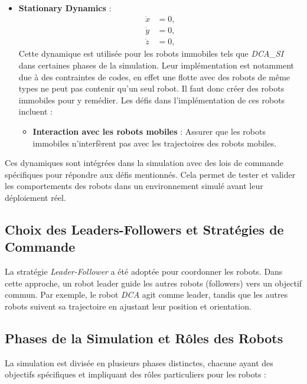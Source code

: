 \documentclass[a4paper,12pt]{article}
\begin{document}
\begin{itemize}
    \item \textbf{Stationary Dynamics} :
    \begin{equation*}
    \begin{aligned}
    \dot{x} &= 0, \\
    \dot{y} &= 0, \\
    \dot{z} &= 0,
    \end{aligned}
    \end{equation*}
    \noindent Cette dynamique est utilisée pour les robots immobiles tels que \textit{DCA\_SI} dans certaines phases de la simulation. Leur implémentation est notamment due à des contraintes de codes, en effet une flotte avec des robots de même types ne peut pas contenir qu'un seul robot. Il faut donc créer des robots immobiles pour y remédier. Les défis dans l'implémentation de ces robots incluent :
    \begin{itemize}
        \item \textbf{Interaction avec les robots mobiles} : Assurer que les robots immobiles n'interfèrent pas avec les trajectoires des robots mobiles.
    \end{itemize}
\end{itemize}

Ces dynamiques sont intégrées dans la simulation avec des lois de commande spécifiques pour répondre aux défis mentionnés. Cela permet de tester et valider les comportements des robots dans un environnement simulé avant leur déploiement réel.

\subsection*{Choix des Leaders-Followers et Stratégies de Commande}
La stratégie \textit{Leader-Follower} a été adoptée pour coordonner les robots. Dans cette approche, un robot leader guide les autres robots (followers) vers un objectif commun. Par exemple, le robot \textit{DCA} agit comme leader, tandis que les autres robots suivent sa trajectoire en ajustant leur position et orientation.

\subsection*{Phases de la Simulation et Rôles des Robots}
La simulation est divisée en plusieurs phases distinctes, chacune ayant des objectifs spécifiques et impliquant des rôles particuliers pour les robots :
\end{document}

